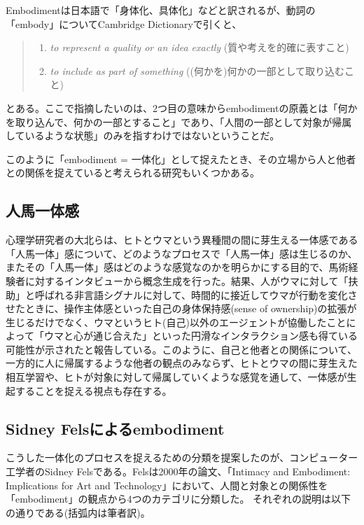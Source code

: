 Embodimentは日本語で「身体化、具体化」などと訳されるが、動詞の「embody」についてCambridge Dictionaryで引くと、
\begin{quote}
  \begin{enumerate}
    \item \textit{to represent a quality or an idea exactly} (質や考えを的確に表すこと) 
    \item \textit{to include as part of something} ((何かを)何かの一部として取り込むこと)
  \end{enumerate}
\end{quote}
とある\cite{embody}。ここで指摘したいのは、2つ目の意味からembodimentの原義とは「何かを取り込んで、何かの一部とすること」であり、「人間の一部として対象が帰属しているような状態」のみを指すわけではないということだ。

このように「embodiment = 一体化」として捉えたとき、その立場から人と他者との関係を捉えていると考えられる研究もいくつかある。

\subsection{人馬一体感}
心理学研究者の大北らは、ヒトとウマという異種間の間に芽生える一体感である「人馬一体」感について、どのようなプロセスで「人馬一体」感は生じるのか、またその「人馬一体」感はどのような感覚なのかを明らかにする目的で、馬術経験者に対するインタビューから概念生成を行った\cite{ohkita2018}。結果、人がウマに対して「扶助」と呼ばれる非言語シグナルに対して、時間的に接近してウマが行動を変化させたときに、操作主体感といった自己の身体保持感(sense of ownership)の拡張が生じるだけでなく、ウマというヒト(自己)以外のエージェントが協働したことによって「ウマと心が通じ合えた」といった円滑なインタラクション感も得ている可能性が示されたと報告している。このように、自己と他者との関係について、一方的に人に帰属するような他者の観点のみならず、ヒトとウマの間に芽生えた相互学習や、ヒトが対象に対して帰属していくような感覚を通して、一体感が生起することを捉える視点も存在する。

\subsection{Sidney Felsによるembodiment}
こうした一体化のプロセスを捉えるための分類を提案したのが、コンピューター工学者のSidney Felsである。Felsは2000年の論文、「Intimacy and Embodiment: Implications for Art and Technology」\cite{Fels}において、人間と対象との関係性を「embodiment」の観点から4つのカテゴリに分類した。
それぞれの説明は以下の通りである(括弧内は筆者訳)。

